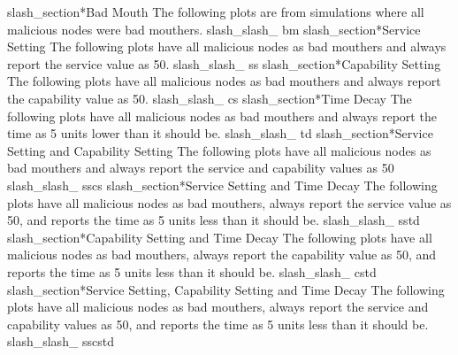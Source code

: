 slash_section*{Bad Mouth}
The following plots are from simulations where all malicious nodes were
bad mouthers.
slash_slash_
bm
slash_section*{Service Setting}
The following plots have all malicious nodes as bad mouthers and always
report the service value as 50.
slash_slash_
ss
slash_section*{Capability Setting}
The following plots have all malicious nodes as bad mouthers and always
report the capability value as 50.
slash_slash_
cs
slash_section*{Time Decay}
The following plots have all malicious nodes as bad mouthers and always
report the time as 5 units lower than it should be.
slash_slash_
td
slash_section*{Service Setting and Capability Setting}
The following plots have all malicious nodes as bad mouthers and always
report the service and capability values as 50
slash_slash_
sscs
slash_section*{Service Setting and Time Decay}
The following plots have all malicious nodes as bad mouthers, always
report the service value as 50, and reports the time as 5 units less than
it should be.
slash_slash_
sstd
slash_section*{Capability Setting and Time Decay}
The following plots have all malicious nodes as bad mouthers, always
report the capability value as 50, and reports the time as 5 units less than
it should be.
slash_slash_
cstd
slash_section*{Service Setting, Capability Setting and Time Decay}
The following plots have all malicious nodes as bad mouthers, always
report the service and capability values as 50, and reports the time as
5 units less than it should be.
slash_slash_
sscstd
